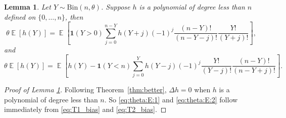 \documentclass[12pt,letterpaper]{article}
\newcommand{\E}{\operatorname{\mathbb{E}}}
\newtheorem{lemma}{Lemma}[section]
\begin{document}
\begin{lemma}\label{lemma:main:cor}
Let $Y\sim \mathrm{Bin}(n, \theta)$. Suppose $h$ is a polynomial of degree less than $n$ defined on $\{0, \ldots, n\}$, then 
\begin{equation}\label{eq:theta:E:1}
\theta \E[h(Y)] = \E\left[\mathbf{1}(Y > 0)\sum_{j=0}^{n-Y}h(Y + j)(-1)^{j}\frac{(n-Y)!}{(n-Y-j)!}\frac{Y!}{(Y+j)!}\right],
\end{equation}
    and
\begin{equation}\label{eq:theta:E:2}
\theta \E[h(Y)] = \E\left[h(Y) - \mathbf{1}(Y < n)\sum_{j=0}^{Y}h(Y - j)(-1)^{j}\frac{Y!}{(Y-j)!}\frac{(n - Y)!}{(n-Y+j)!}\right].
\end{equation}
  
\end{lemma}
\begin{proof}[Proof of Lemma \ref{lemma:main:cor}]
Following Theorem~\ref{thm:better}, $\Delta h = 0$ when $h$ is a polynomial of degree less than $n$. So \eqref{eq:theta:E:1} and \eqref{eq:theta:E:2} follow immediately from \eqref{eq:T1_bias} and \eqref{eq:T2_bias}. 
\end{proof}
\end{document}

